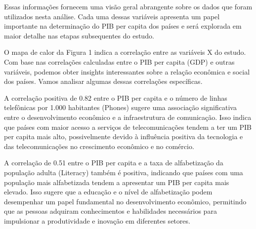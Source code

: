 \documentclass[conference]{IEEEtran}
\begin{document}
Essas informações fornecem uma visão geral abrangente sobre os dados que foram utilizados nesta análise. Cada uma dessas variáveis apresenta um papel importante na determinação do PIB per capita dos países e será explorada em maior detalhe nas etapas subsequentes do estudo.

O mapa de calor da Figura 1 indica a correlação entre as variáveis X do estudo. Com base nas correlações calculadas entre o PIB per capita (GDP) e outras variáveis, podemos obter insights interessantes sobre a relação econômica e social dos países. Vamos analisar algumas dessas correlações específicas.

\begin{figure}[htbp]
  \centering
  \begin{floatrow}
  \end{floatrow}
\end{figure}

A correlação positiva de 0.82 entre o PIB per capita e o número de linhas telefônicas por 1.000 habitantes (Phones) sugere uma associação significativa entre o desenvolvimento econômico e a infraestrutura de comunicação. Isso indica que países com maior acesso a serviços de telecomunicações tendem a ter um PIB per capita mais alto, possivelmente devido à influência positiva da tecnologia e das telecomunicações no crescimento econômico e no comércio.

A correlação de 0.51 entre o PIB per capita e a taxa de alfabetização da população adulta (Literacy) também é positiva, indicando que países com uma população mais alfabetizada tendem a apresentar um PIB per capita mais elevado. Isso sugere que a educação e o nível de alfabetização podem desempenhar um papel fundamental no desenvolvimento econômico, permitindo que as pessoas adquiram conhecimentos e habilidades necessários para impulsionar a produtividade e inovação em diferentes setores.
\end{document}
